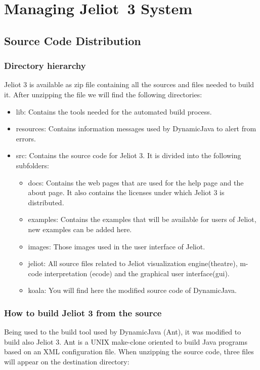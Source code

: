 \section{Managing Jeliot~3 System}
\label{sec:Managing_Jeliot_3_System}


\subsection{Source Code Distribution}
\label{sec:Source_Code_Distribution}

\subsubsection{Directory hierarchy}

Jeliot 3 is available as zip file containing all the sources and files needed to build it. After unzipping the file we will find the following directories:
\begin{itemize}
\item lib:  Contains the tools needed for the automated build process.
\item resources: Contains information messages used by DynamicJava to alert from errors.
\item src: Contains the source code for Jeliot 3. It is divided into the following subfolders:
\begin{itemize}
\item docs:  Contains the web pages that are used for the help page and the about page. It also contains the licenses under which Jeliot 3 is distributed.
\item examples: Contains the examples that will be available for users of Jeliot, new examples can be added here.
\item images: Those images used in the user interface of Jeliot.
\item jeliot: All source files related to Jeliot visualization engine(theatre), m-code interpretation (ecode) and the graphical user interface(gui).
\item koala: You will find here the modified source code of DynamicJava.
\end{itemize}
\end{itemize}

\subsubsection{How to build Jeliot 3 from the source}

Being used to the build tool used by DynamicJava (Ant), it was modified to build also Jeliot 3. Ant is a UNIX make-clone oriented to build Java programs based on an XML configuration file.
When unzipping the source code, three files will appear on the destination directory:

